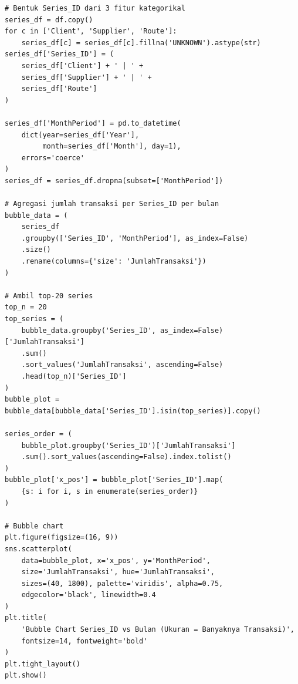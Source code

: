 \begin{lstlisting}[style=pycode,caption={Bubble chart top-20 Series\_ID berdasarkan transaksi}]
# Bentuk Series_ID dari 3 fitur kategorikal
series_df = df.copy()
for c in ['Client', 'Supplier', 'Route']:
    series_df[c] = series_df[c].fillna('UNKNOWN').astype(str)
series_df['Series_ID'] = (
    series_df['Client'] + ' | ' +
    series_df['Supplier'] + ' | ' +
    series_df['Route']
)

series_df['MonthPeriod'] = pd.to_datetime(
    dict(year=series_df['Year'],
         month=series_df['Month'], day=1),
    errors='coerce'
)
series_df = series_df.dropna(subset=['MonthPeriod'])

# Agregasi jumlah transaksi per Series_ID per bulan
bubble_data = (
    series_df
    .groupby(['Series_ID', 'MonthPeriod'], as_index=False)
    .size()
    .rename(columns={'size': 'JumlahTransaksi'})
)

# Ambil top-20 series
top_n = 20
top_series = (
    bubble_data.groupby('Series_ID', as_index=False)['JumlahTransaksi']
    .sum()
    .sort_values('JumlahTransaksi', ascending=False)
    .head(top_n)['Series_ID']
)
bubble_plot = bubble_data[bubble_data['Series_ID'].isin(top_series)].copy()

series_order = (
    bubble_plot.groupby('Series_ID')['JumlahTransaksi']
    .sum().sort_values(ascending=False).index.tolist()
)
bubble_plot['x_pos'] = bubble_plot['Series_ID'].map(
    {s: i for i, s in enumerate(series_order)}
)

# Bubble chart
plt.figure(figsize=(16, 9))
sns.scatterplot(
    data=bubble_plot, x='x_pos', y='MonthPeriod',
    size='JumlahTransaksi', hue='JumlahTransaksi',
    sizes=(40, 1800), palette='viridis', alpha=0.75,
    edgecolor='black', linewidth=0.4
)
plt.title(
    'Bubble Chart Series_ID vs Bulan (Ukuran = Banyaknya Transaksi)',
    fontsize=14, fontweight='bold'
)
plt.tight_layout()
plt.show()
\end{lstlisting}

